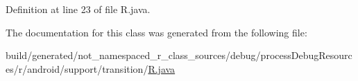Definition at line 23 of file R.\+java.



The documentation for this class was generated from the following file\+:\begin{DoxyCompactItemize}
\item 
build/generated/not\+\_\+namespaced\+\_\+r\+\_\+class\+\_\+sources/debug/process\+Debug\+Resources/r/android/support/transition/\mbox{\hyperlink{android_2support_2transition_2_r_8java}{R.\+java}}\end{DoxyCompactItemize}

